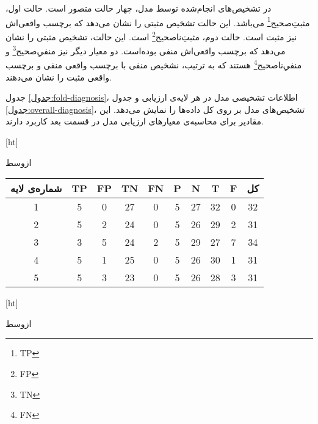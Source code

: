 در تشخیص‌های انجام‌شده توسط مدل، چهار حالت متصور است.
حالت اول، 
مثبتِ‌صحیح\footnote{TP}
می‌باشد.
این حالت تشخیص مثبتی را نشان می‌دهد که برچسب واقعی‌اش نیز مثبت است.
حالت دوم، 
مثبتِ‌ناصحیح\footnote{FP}
است.
این حالت، تشخیص مثبتی را نشان می‌دهد که برچسب واقعی‌اش منفی بوده‌است.
دو معیار دیگر نیز 
منفیِ‌صحیح\footnote{TN}
و منفیِ‌ناصحیح\footnote{FN}
هستند که به ترتیب، نشخیص منفی با برچسب واقعی منفی و برچسب واقعی مثبت را نشان می‌دهند.

جدول \ref{جدول:fold-diagnosis}، اطلاعات تشخیصی مدل در
هر لایه‌ی ارزیابی و جدول \ref{جدول:overall-diagnosis}،
تشخیص‌های مدل بر روی کل داده‌ها را نمایش می‌دهد.
این مقادیر برای محاسبه‌ی معیار‌های ارزیابی مدل در قسمت بعد کاربرد دارند.

[ht]

\vspace{1.5em}

‌ازوسط

\begin{tabular}{cccccccccc}
    \hline
     
    شماره‌ی لایه & TP & FP & TN & FN & P & N  & T  & F & کل\\ \hline
    1           & 5  & 0  & 27 & 0  & 5 & 27 & 32 & 0 & 32 \\ 
    2           & 5  & 2  & 24 & 0  & 5 & 26 & 29 & 2 & 31\\ 
    3           & 3  & 5  & 24 & 2  & 5 & 29 & 27 & 7 & 34\\ 
    4           & 5  & 1  & 25 & 0  & 5 & 26 & 30 & 1 & 31\\ 
    5           & 5  & 3  & 23 & 0  & 5 & 26 & 28 & 3 & 31\\ \hline
    \end{tabular}


[ht]

\vspace{1.5em}

‌ازوسط

